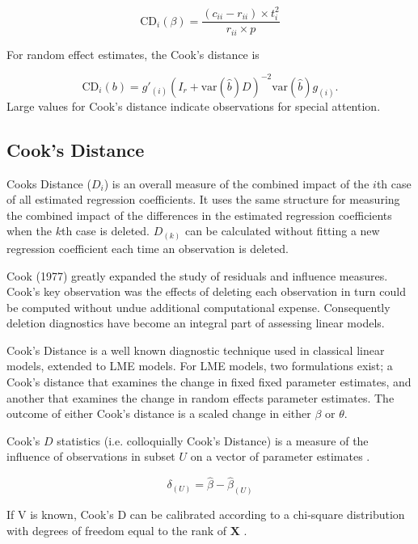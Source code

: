\documentclass[12pt, a4paper]{article}
\begin{document}
\[
\mbox{CD}_{i}(\beta) = \frac{(c_{ii} - r_{ii}) \times t^2_{i}}{r_{ii} \times p}
\]

For random effect estimates, the  Cook's distance is

\[
\mbox{CD}_{i}(b) = g{\prime}_{(i)} (I_{r} + \mbox{var}(\hat{b})D)^{-2}\mbox{var}(\hat{b})g_{(i)}.
\]
Large values for Cook's distance indicate observations for special attention.



\subsection{Cook's Distance}%
Cooks Distance ($D_{i}$) is an overall measure of the combined impact of the $i$th case of all estimated regression coefficients. It uses the same structure for measuring the combined impact of the differences in the estimated regression coefficients when the $k$th case is deleted. $D_{(k)}$ can be calculated without fitting
a new regression coefficient each time an observation is deleted.




Cook (1977) greatly expanded the study of residuals and influence measures. Cook's key observation was the effects of deleting each observation in turn could be computed without undue additional computational expense. Consequently deletion diagnostics have become an integral part of assessing linear models.


Cook's Distance is a well known diagnostic technique used in classical linear models, extended to LME models.  For LME models, two formulations exist; a Cook's distance that examines the change in fixed fixed parameter estimates, and another that examines the change in random effects parameter estimates. The outcome of either Cook's distance is a scaled change in either $\beta$ or $\theta$.


 Cook's $D$ statistics (i.e. colloquially Cook's Distance) is a measure of the influence of observations in subset $U$ on a vector of parameter estimates \citep{cook77}.


\[ \delta_{(U)} = \hat{\beta} - \hat{\beta}_{(U)}\]


If V is known, Cook's D can be calibrated according to a chi-square distribution with degrees of freedom equal to the rank of $\boldsymbol{X}$ \citep{cpj92}.
\end{document}
